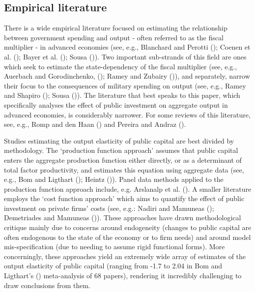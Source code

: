 \documentclass[titlepage, 11pt, a4paper]{article}
\renewcommand{\&}{and}
\begin{document}
\subsection{Empirical literature} \label{lit1}
There is a wide empirical literature focused on estimating the relationship between government spending and output - often referred to as the fiscal multiplier - in advanced economies (see, e.g., Blanchard and Perotti (\citeyear{blanchard2002empirical}); Coenen et al. (\citeyear{coenen2012effects}); Bayer et al. (\citeyear{bayer2023coronavirus}); Sousa (\citeyear{sousa2025taking})). Two important sub-strands of this field are ones which seek  to estimate the state-dependency of the fiscal multiplier (see, e.g., Auerbach and Gorodinchenko, (\citeyear{auerbach2012measuring}); Ramey and Zubairy (\citeyear{ramey2018government})), and separately, narrow their focus to the consequences of military spending on output (see, e.g., Ramey and Shapiro (\citeyear{ramey1998costly}); Sousa (\citeyear{sousa2025taking})). The literature that best speaks to this paper, which specifically analyses the effect of
public investment on aggregate output in advanced economies, is considerably narrower. For some reviews of this literature, see, e.g., Romp and den Haan (\citeyear{romp2007public}) and Pereira and Andraz (\citeyear{pereira2013economic}). 

Studies estimating the output elasticity of public capital are best divided by methodology. The ‘production function approach’ assumes that public capital enters the aggregate production function either directly, or as a determinant of total factor productivity, and estimates this equation using aggregate data  
(see, e.g., Bom and Ligthart (\citeyear{bom2014have}); Heintz (\citeyear{heintz2010impact})).  Panel data methods applied to the production function approach include, e.g. Arslanalp et al. (\citeyear{arslanalp2010public}). A smaller literature employs the `cost function approach' which aims to quantify the effect of public investment on private firms' costs (see, e.g.: Nadiri and Mamuneas (\citeyear{nadiri1991effects}); Demetriades and Mamuneas (\citeyear{demetriades2000intertemporal})). 
These approaches have drawn methodological critique mainly due to concerns around endogeneity (changes to public capital are often endogenous to the state of the economy or to firm needs) and around model mis-specification (due to needing to assume rigid functional forms). More concerningly, these approaches yield an extremely wide array of estimates of the output elasticity of public capital (ranging from -1.7 to 2.04 in Bom and Ligthart's (\citeyear{bom2014have}) meta-analysis of 68 papers), rendering it incredibly challenging to draw conclusions from them.
\end{document}
